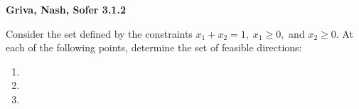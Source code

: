 \textbf{Griva, Nash, Sofer 3.1.2}

Consider the set defined by the constraints $x_1 + x_2 = 1,\; x_1 \ge 0,$ and $x_2 \ge 0$. 
At each of the following points, determine the set of feasible directions:

\begin{enumerate}
  \item 
  \pagebreak
  \item 
  \pagebreak
  \item 
\end{enumerate}